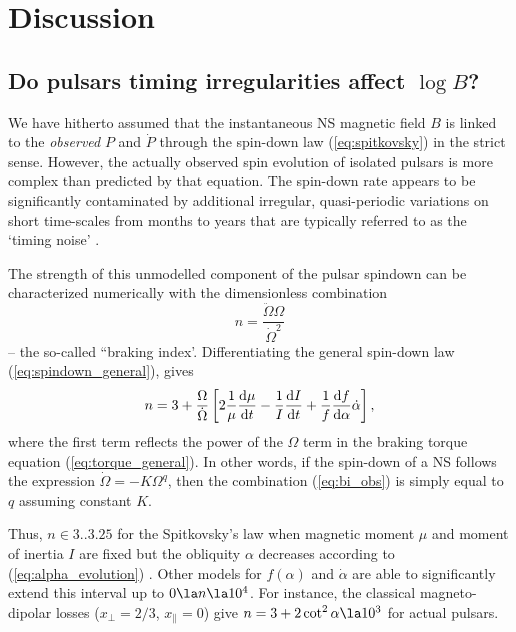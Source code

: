 \documentclass[fleqn,usenatbib]{mnras}
\begin{document}
\section{Discussion}
\label{sect:discuss}

\subsection{Do pulsars timing irregularities affect $\log B$?}
\label{sect:timingnoise}
We have hitherto assumed that the instantaneous NS magnetic field
$B$ is linked to the {\it observed} $P$ and $\dot P$ through the spin-down law
(\ref{eq:spitkovsky}) in the strict sense. However, the actually observed spin evolution of isolated pulsars is more complex than predicted by that
equation. The spin-down rate appears to be significantly contaminated by additional irregular, quasi-periodic variations on short
time-scales from months to years that are typically referred to as
the `timing noise' \citep{boyn72, ch80, daless95, urama06, hobbs10, nice13}.

The strength of this unmodelled component of the pulsar spindown can be characterized numerically with the dimensionless combination
\begin{equation}
	n = \dfrac{\ddot \Omega \Omega}{\dot \Omega^2}
	\label{eq:bi_obs}
\end{equation}
-- the so-called ``braking index'. Differentiating the general spin-down law (\ref{eq:spindown_general}), gives
\begin{equation}
	n = 3 + \dfrac{\Omega}{\dot \Omega} \left [2\dfrac{1}{\mu}\dfrac{{\rm d}\mu}{{\rm
d}t} - \dfrac{1}{I}\dfrac{{\rm d}I}{{\rm d}t} + \dfrac{1}{f}\dfrac{{\rm d}f}{{\rm d}\alpha} \dot\alpha \right],
	\label{eq:bi}
\end{equation}
where the first term reflects the power of the $\Omega$ term in the braking torque equation (\ref{eq:torque_general}). In other words,
if the spin-down of a NS follows the expression
$\dot \Omega = - K \Omega^q$, then the combination
(\ref{eq:bi_obs}) is simply equal to $q$ assuming constant $K$.

Thus, $n \in 3..3.25$ for the Spitkovsky's law when magnetic moment $\mu$ and moment of inertia $I$ are fixed but
the obliquity $\alpha$ decreases according to (\ref{eq:alpha_evolution}) \citep[e.g.][]{eksi16}. Other models for $f(\alpha)$ and
$\dot\alpha$ are able to significantly extend this interval up to $0 \la n \la 10^4$. For instance, the classical magneto-dipolar
losses ($x_{\perp} = 2/3$, $x_{\parallel} = 0$) give $n = 3 + 2\cot^2\alpha \la 10^3$ for actual pulsars.
\end{document}
